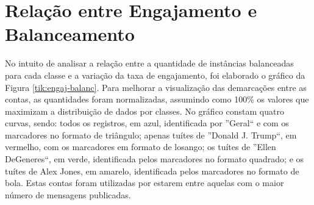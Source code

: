 \documentclass[oneside,openright,12pt]{ufsm_2015} %
\begin{document}

\section{Relação entre Engajamento e Balanceamento}
\label{sec:exp-engaj-balanc}

    \par No intuito de analisar a relação entre a quantidade de instâncias balanceadas para cada classe e a variação da taxa de engajamento, foi elaborado o gráfico da Figura \ref{tik:engaj-balanc}. Para melhorar a visualização das demarcações entre as contas, as quantidades foram normalizadas, assumindo como 100\% os valores que maximizam a distribuição de dados por classes. No gráfico constam quatro curvas, sendo: todos os registros, em azul, identificada por ''Geral`` e com os marcadores no formato de triângulo; apenas tuítes de ''Donald J. Trump``, em vermelho, com os marcadores em formato de losango; os tuítes de ''Ellen DeGeneres``, em verde, identificada pelos marcadores no formato quadrado; e os tuítes de Alex Jones, em amarelo, identificada pelos marcadores no formato de bola. Estas contas foram utilizadas por estarem entre aquelas com o maior número de mensagens publicadas.
    
\end{document}
